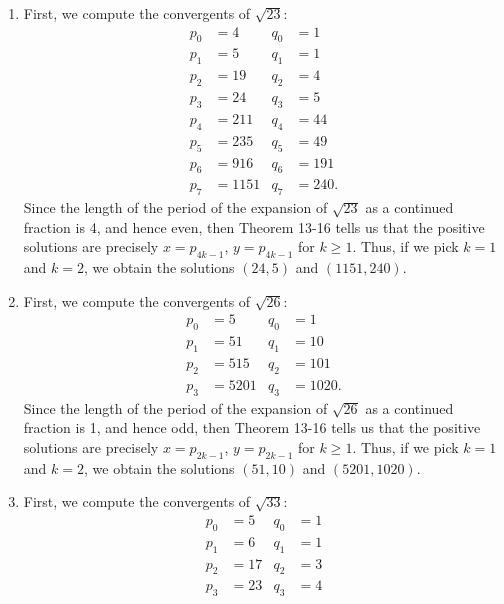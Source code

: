 \begin{solution}
    \begin{enumerate}
        \item First, we compute the convergents of $\sqrt{23}$:
        \begin{align*}
            p_0 &= 4 & q_0 &= 1 \\
            p_1 &= 5 & q_1 &= 1  \\
            p_2 &= 19 & q_2 &= 4 \\
            p_3 &= 24 & q_3 &= 5 \\
            p_4 &= 211 & q_4 &= 44 \\
            p_5 &= 235 & q_5 &= 49 \\
            p_6 &= 916 & q_6 &= 191 \\
            p_7 &= 1151 & q_7 &= 240.
        \end{align*}
        Since the length of the period of the expansion of $\sqrt{23}$ as a continued fraction is 4, and hence even, then Theorem 13-16 tells us that the positive solutions are precisely $x = p_{4k-1}$, $y = p_{4k-1}$ for $k \geq 1$. Thus, if we pick $k = 1$ and $k = 2$, we obtain the solutions $(24,5)$ and $(1151, 240)$. \\
        \item First, we compute the convergents of $\sqrt{26}$:
        \begin{align*}
            p_0 &= 5 & q_0 &= 1 \\
            p_1 &= 51 & q_1 &= 10  \\
            p_2 &= 515 & q_2 &= 101 \\
            p_3 &= 5201 & q_3 &= 1020.
        \end{align*}
        Since the length of the period of the expansion of $\sqrt{26}$ as a continued fraction is 1, and hence odd, then Theorem 13-16 tells us that the positive solutions are precisely $x = p_{2k-1}$, $y = p_{2k-1}$ for $k \geq 1$. Thus, if we pick $k = 1$ and $k = 2$, we obtain the solutions $(51,10)$ and $(5201, 1020)$. \\
        \item First, we compute the convergents of $\sqrt{33}$:
        \begin{align*}
            p_0 &= 5 & q_0 &= 1 \\
            p_1 &= 6 & q_1 &= 1  \\
            p_2 &= 17 & q_2 &= 3 \\
            p_3 &= 23 & q_3 &= 4 \\

\end{align*}
\end{enumerate}
\end{solution}
